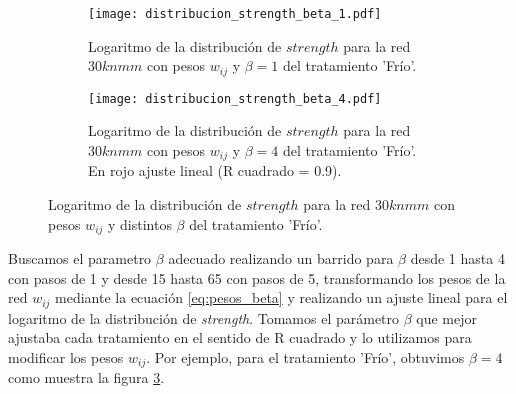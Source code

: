 \begin{figure}[t!]
    \centering
    \begin{subfigure}[t]{0.45\textwidth}
    \centering
    \texttt{[image: distribucion\_strength\_beta\_1.pdf]}
    \caption{Logaritmo de la distribución de $strength$ para la red $30knmm$ con pesos $w_{ij}$ y $\beta=1$ del tratamiento 'Frío'.}
    \label{fig:distribucion_strength_beta_1}
    \end{subfigure}    
    \begin{subfigure}[t]{0.45\textwidth}
    \centering
    \texttt{[image: distribucion\_strength\_beta\_4.pdf]}
    \caption{Logaritmo de la distribución de $strength$ para la red $30knmm$ con pesos $w_{ij}$ y $\beta=4$ del tratamiento 'Frío'. En rojo ajuste lineal (R cuadrado = 0.9).}
    \label{fig:distribucion_strength_beta_4}
    \end{subfigure}    
    \caption{Logaritmo de la distribución de $strength$ para la red $30knmm$ con pesos $w_{ij}$ y distintos $\beta$ del tratamiento 'Frío'.}
\end{figure}
Buscamos el parametro $\beta$ adecuado realizando un barrido para $\beta$ desde 1 hasta 4 con pasos de 1 y desde 15 hasta 65 con pasos de 5, transformando los pesos de la red $w_{ij}$ mediante la ecuación \ref{eq:pesos_beta} y realizando un ajuste lineal para el logaritmo de la distribución de \textit{strength}. Tomamos el parámetro $\beta$ que mejor ajustaba cada tratamiento en el sentido de R cuadrado y lo utilizamos para modificar los pesos $w_{ij}$. Por ejemplo, para el tratamiento 'Frío', obtuvimos $\beta=4$ como muestra la figura \ref{fig:distribucion_strength_beta_4}.
